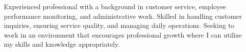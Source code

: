 Experienced professional with a background in customer service, employee performance monitoring, and administrative work. Skilled in handling customer inquiries, ensuring service quality, and managing daily operations. Seeking to work in an environment that encourages professional growth where I can utilize my skills and knowledge appropriately.